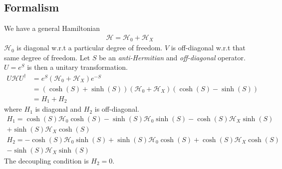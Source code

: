 \subsection{Formalism}
We have a general Hamiltonian
\begin{equation}\begin{aligned}
\mathcal{H} = \mathcal{H}_0 + \mathcal{H}_X
\end{aligned}\end{equation}
\(\mathcal{H}_0\) is diagonal w.r.t a particular degree of freedom. \(V\) is off-diagonal w.r.t that same degree of freedom. Let \(S\) be an \textit{anti-Hermitian} and \textit{off-diagonal} operator. \(U = e^S\) is then a unitary transformation.
\begin{equation}\begin{aligned}
	U \mathcal{H} U^\dagger &= e^S \left(\mathcal{H}_0 + \mathcal{H}_X\right)e^{-S}\\
				&= \left(\cosh\left(S\right) + \sinh\left(S\right)\right)\left(\mathcal{H}_0 + \mathcal{H}_X\right)\left(\cosh\left(S\right) - \sinh\left(S\right)\right)\\
         &= H_1 + H_2
\end{aligned}\end{equation}
where \(H_1\) is diagonal and \(H_2\) is off-diagonal.
\begin{equation}\begin{aligned}
	H_1=\cosh\left(S\right) \mathcal{H}_0 \cosh\left(S\right) - \sinh\left(S\right) \mathcal{H}_0 \sinh\left(S\right) -\cosh\left(S\right) \mathcal{H}_X \sinh\left(S\right)\\
	+\sinh\left(S\right) \mathcal{H}_X \cosh\left(S\right)\\
	H_2 = - \cosh\left(S\right) \mathcal{H}_0 \sinh\left(S\right) + \sinh\left(S\right) \mathcal{H}_0 \cosh\left(S\right) +\cosh\left(S\right) \mathcal{H}_X \cosh\left(S\right)\\
	-\sinh\left(S\right) \mathcal{H}_X \sinh\left(S\right)
\end{aligned}\end{equation}
The decoupling condition is \(H_2=0\).

